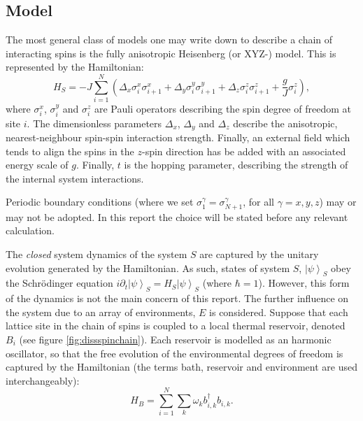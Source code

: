 \documentclass[11pt,a4paper,article,oneside]{memoir}
\newcommand{\ket}[1]{\left| #1\right\rangle}
\begin{document}
\subsection{Model}
The most general class of models one may write down to describe a
chain of interacting spins is the fully anisotropic Heisenberg (or
XYZ-) model. This is represented by the Hamiltonian:
\begin{equation}
  H_S = -J\sum_{i=1}^N
  \left(\Delta_x\sigma^x_i\sigma^x_{i+1}+\Delta_y\sigma^y_i\sigma^y_{i+1}+
  \Delta_z\sigma^z_i\sigma^z_{i+1}+\frac{g}{J}\sigma^z_i\right),
\end{equation}
where $\sigma^x_i$, $\sigma^y_i$ and $\sigma^z_i$ are Pauli operators
describing the spin degree of freedom at site $i$. The dimensionless
parameters $\Delta_x$, $\Delta_y$ and $\Delta_z$ describe the
anisotropic, nearest-neighbour spin-spin interaction strength.
Finally, an external field which tends to align the spins in the
$z$-spin direction has be added with an associated energy scale of
$g$. Finally, $t$ is the hopping parameter, describing the strength of
the internal system interactions. 
\par Periodic boundary
conditions (where we set $\sigma^\gamma_1=\sigma^\gamma_{N+1}$, for all
$\gamma=x,y,z$) may or may not be adopted. In this report the choice
will be stated before any relevant calculation.
\par The
\textit{closed} system dynamics of the system $S$ are captured by the
unitary evolution generated by the Hamiltonian. As such, states of
system $S$, $\ket{\psi}_S$ obey the Schr\"odinger equation
$i\partial_t\ket{\psi}_S=H_S\ket{\psi}_S$ (where $\hbar=1$). However,
this form of the dynamics is not the main concern of this report. The
further influence on the system due to an array of environments, $E$
is considered. Suppose that each lattice site in the chain of spins is
coupled to a local thermal reservoir, denoted $B_i$ (see figure
\ref{fig:dissspinchain}). Each reservoir is modelled as an harmonic
oscillator, so that the free evolution of the environmental degrees of
freedom is captured by the Hamiltonian (the terms bath, reservoir and
environment are used interchangeably):
\begin{equation}
  H_B = \sum_{i=1}^N\sum_k\omega_kb^\dagger_{i,k}b_{i,k}.
\end{equation}
\end{document}
